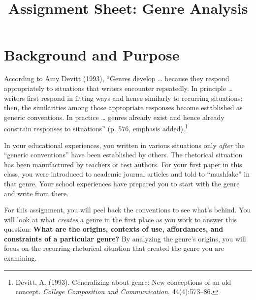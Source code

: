 \documentclass[10pt, oneside, twocolumn]{amsart}	%
\title[Genre Analysis]{Assignment Sheet: Genre Analysis}
\begin{document}
%
\thispagestyle{empty}


\section{Background and Purpose} %
\label{sec:background}
According to Amy Devitt (1993), ``Genres develop … because they respond appropriately to situations that writers encounter repeatedly. In principle … writers first respond in fitting ways and hence similarly to recurring situations; then, the similarities among those appropriate responses become established as generic conventions. In practice … genres already exist and hence already constrain responses to situations'' (p. 576, emphasis added).\footnote{Devitt, A. (1993). Generalizing about genre: New conceptions of an old concept. \emph{College Composition and Communication}, 44(4):573--86.} 

In your educational experiences, you written in various situations only \emph{after} the ``generic conventions'' have been established by others. The rhetorical situation has been manufactured by teachers or test authors. For your first paper in this class, you were introduced to academic journal articles and told to ``mushfake'' in that genre. Your school experiences have prepared you to start with the genre and write from there.

For this assignment, %
you will peel back the conventions to see what's behind. You will look at what \emph{creates} a genre in the first place as you work to answer this question: \textbf{What are the origins, contexts of use, affordances, and constraints of a particular genre?} By analyzing the genre's origins, you will focus on the recurring rhetorical situation that created the genre you are examining.
\end{document}
